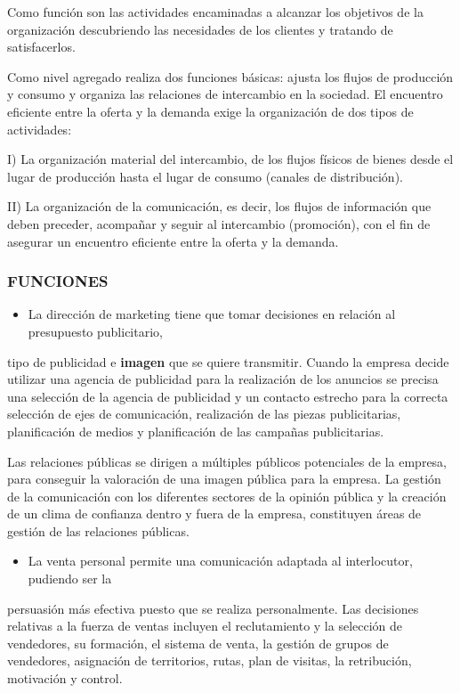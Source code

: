 Como función son las actividades encaminadas a alcanzar los objetivos de la organización descubriendo las necesidades de los clientes y tratando de satisfacerlos.

Como nivel agregado realiza dos funciones básicas: ajusta los flujos de producción y consumo y organiza las relaciones de intercambio en la sociedad. El encuentro eficiente entre la oferta y la demanda exige la organización de dos tipos de actividades:

I) La organización material del intercambio, de los flujos físicos de bienes desde el lugar de producción hasta el lugar de consumo (canales de distribución).

II) La organización de la comunicación, es decir, los flujos de información que deben preceder, acompañar y seguir al intercambio (promoción), con el fin de asegurar un encuentro eficiente entre la oferta y la demanda.

\subsubsection*{FUNCIONES}
\begin{itemize}
  \item La dirección de marketing tiene que tomar decisiones en relación al presupuesto publicitario,
\end{itemize}
tipo de publicidad e \textbf{imagen }que se quiere transmitir. Cuando la empresa decide utilizar una agencia de publicidad para la realización de los anuncios se precisa una selección de la agencia de publicidad y un contacto estrecho para la correcta selección de ejes de comunicación, realización de las piezas publicitarias, planificación de medios y planificación de las campañas publicitarias.

Las relaciones públicas se dirigen a múltiples públicos potenciales de la empresa, para conseguir la valoración de una imagen pública para la empresa. La gestión de la comunicación con los diferentes sectores de la opinión pública y la creación de un clima de confianza dentro y fuera de la empresa, constituyen áreas de gestión de las relaciones públicas.

\begin{itemize}
  \item La venta personal permite una comunicación adaptada al interlocutor, pudiendo ser la
\end{itemize}
persuasión más efectiva puesto que se realiza personalmente. Las decisiones relativas a la fuerza de ventas incluyen el reclutamiento y la selección de vendedores, su formación, el sistema de venta, la gestión de grupos de vendedores, asignación de territorios, rutas, plan de visitas, la retribución, motivación y control.

